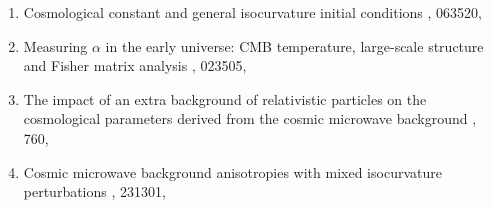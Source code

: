 \begin{enumerate}
\item
{}
{Cosmological constant and general isocurvature initial conditions}
{, 063520, }

\item  
{}
{Measuring $\alpha$ in the early universe: {CMB} temperature, large-scale structure and {Fisher} matrix analysis}
{, 023505, }

\item 
\onestar {}
{The impact of an extra background of relativistic particles on the cosmological parameters derived from the cosmic microwave background}
{, 760, }

\item  
{}
{Cosmic microwave background anisotropies with mixed isocurvature perturbations}
{, 231301, }
\end{enumerate}
\setcounter{nRefPhysicsPapers}{\value{enumi}}

\vspace{\baselineskip}



